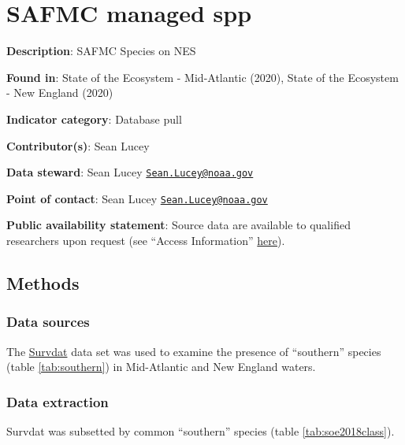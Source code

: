 \documentclass[
]{book}
\begin{document}
\hypertarget{safmc-managed-spp}{%
\chapter{SAFMC managed spp}\label{safmc-managed-spp}}

\textbf{Description}: SAFMC Species on NES

\textbf{Found in}: State of the Ecosystem - Mid-Atlantic (2020), State of the Ecosystem - New England (2020)

\textbf{Indicator category}: Database pull

\textbf{Contributor(s)}: Sean Lucey

\textbf{Data steward}: Sean Lucey \href{mailto:Sean.Lucey@noaa.gov}{\nolinkurl{Sean.Lucey@noaa.gov}}

\textbf{Point of contact}: Sean Lucey \href{mailto:Sean.Lucey@noaa.gov}{\nolinkurl{Sean.Lucey@noaa.gov}}

\textbf{Public availability statement}: Source data are available to qualified researchers upon request (see ``Access Information'' \href{https://inport.nmfs.noaa.gov/inport/item/22560}{here}).

\hypertarget{methods-32}{%
\section{Methods}\label{methods-32}}

\hypertarget{data-sources-32}{%
\subsection{Data sources}\label{data-sources-32}}

The \protect\hyperlink{survdat}{Survdat} data set was used to examine the presence of ``southern'' species (table \ref{tab:southern}) in Mid-Atlantic and New England waters.

\hypertarget{data-extraction-27}{%
\subsection{Data extraction}\label{data-extraction-27}}

Survdat was subsetted by common ``southern'' species (table \ref{tab:soe2018class}).
\end{document}
